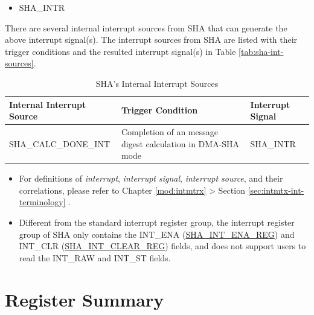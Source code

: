 \documentclass[main\_\_EN.tex]{subfiles}
\begin{document}
    \begin{itemize}
        \item SHA\_INTR
    \end{itemize}

There are several internal interrupt sources from SHA that can generate the above interrupt signal(s). The interrupt sources from SHA are listed with their trigger conditions and the resulted interrupt signal(s) in Table \ref{tab:sha-int-sources}.

\begin{longtable}{ | L{5cm} | L{6.5cm} | L{4cm} | }
\caption{SHA's Internal Interrupt Sources} \label{tab:sha-int-sources}
\\ \hline
{}
\textbf{Internal Interrupt Source} & \textbf{Trigger Condition}  &  \textbf{Interrupt Signal}\\ \hline
\label{int:SHACALCDONEINT}SHA\_CALC\_DONE\_INT  &  Completion of an message digest calculation in DMA-SHA mode &  SHA\_INTR  \\ \hline
\end{longtable}

\begin{tiplisting}
\begin{itemize}
    \item For definitions of \textit{interrupt}, \textit{interrupt signal}, \textit{interrupt source}, and their correlations, please refer to Chapter \ref{mod:intmtrx} \textit{} > Section \ref{sec:intmtx-int-terminology} \textit{}.
    \item Different from the standard interrupt register group, the interrupt register group of SHA only contains the INT\_ENA (\hyperref[regdesc:SHAINTENAREG]{SHA\_INT\_ENA\_REG}) and INT\_CLR (\hyperref[regdesc:SHAINTCLEARREG]{SHA\_INT\_CLEAR\_REG}) fields, and does not support users to read the INT\_RAW and INT\_ST fields.
\end{itemize}
\end{tiplisting}





\newpage
\hypertarget{sha-reg-summ}{}
\section{Register Summary}
\label{sec:sha-reg-summ}
\end{document}
